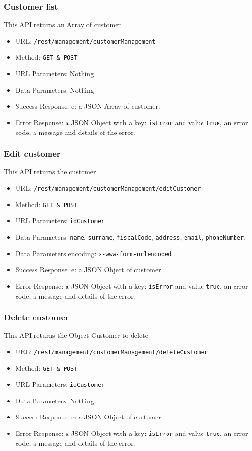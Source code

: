 \subsubsection*{Customer list}
This API returns an Array of customer

\begin{itemize}
    \item URL: \texttt{/rest/management/customerManagement}
    \item Method: \texttt{{GET \& POST}}
    \item URL Parameters: Nothing
    \item Data Parameters: Nothing
    \item Success Response: e: a JSON Array of customer.
    \item Error Response: a JSON Object with a key: \texttt{isError}  and value \texttt{true}, an error code, a message and details of the error.
\end{itemize}

\subsubsection*{Edit customer}
This API returns the customer
\begin{itemize}
    \item URL: \texttt{/rest/management/customerManagement/editCustomer}
    \item Method: \texttt{{GET \& POST}}
    \item URL Parameters: \texttt{idCustomer}
    \item Data Parameters: \texttt{name}, \texttt{surname}, \texttt{fiscalCode}, \texttt{address}, \texttt{email}, \texttt{phoneNumber}.
    \item Data Parameters encoding: \texttt{x-www-form-urlencoded}
    \item Success Response: e: a JSON Object of customer.
    \item Error Response: a JSON Object with a key: \texttt{isError}  and value \texttt{true}, an error code, a message and details of the error.
\end{itemize}

\subsubsection*{Delete customer}
This API returns the Object Customer to delete
\begin{itemize}
    \item URL: \texttt{/rest/management/customerManagement/deleteCustomer}
    \item Method: \texttt{{GET \& POST}}
    \item URL Parameters: \texttt{idCustomer}
    \item Data Parameters: Nothing.
    \item Success Response: e: a JSON Object of customer.
    \item Error Response: a JSON Object with a key: \texttt{isError}  and value \texttt{true}, an error code, a message and details of the error.
\end{itemize}

